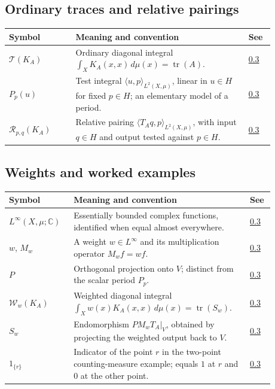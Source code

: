 \subsection*{Ordinary traces and relative pairings}\label{v1a-notation-pairings}

\begin{longtable}{p{0.22\linewidth}p{0.58\linewidth}p{0.08\linewidth}}
\textbf{Symbol} & \textbf{Meaning and convention} & \textbf{See} \\ \hline
$\mathcal T(K_A)$ & Ordinary diagonal integral $\int_X K_A(x,x)\,d\mu(x)=\operatorname{tr}(A)$. & \hyperref[ordinary-finite-trace]{0.3} \\
$P_p(u)$ & Test integral $\langle u,p\rangle_{L^2(X,\mu)}$, linear in $u\in H$ for fixed $p\in H$; an elementary model of a period. & \hyperref[relative-finite-pairing]{0.3} \\
$\mathcal R_{p,q}(K_A)$ & Relative pairing $\langle T_Aq,p\rangle_{L^2(X,\mu)}$, with input $q\in H$ and output tested against $p\in H$. & \hyperref[relative-finite-pairing]{0.3} \\
\end{longtable}

\subsection*{Weights and worked examples}\label{v1a-notation-weights}

\begin{longtable}{p{0.22\linewidth}p{0.58\linewidth}p{0.08\linewidth}}
\textbf{Symbol} & \textbf{Meaning and convention} & \textbf{See} \\ \hline
$L^\infty(X,\mu;\mathbb C)$ & Essentially bounded complex functions, identified when equal almost everywhere. & \hyperref[weighted-finite-trace]{0.3} \\
$w$, $M_w$ & A weight $w\in L^\infty$ and its multiplication operator $M_wf=wf$. & \hyperref[weighted-finite-trace]{0.3} \\
$P$ & Orthogonal projection onto $V$; distinct from the scalar period $P_p$. & \hyperref[weighted-finite-trace]{0.3} \\
$\mathcal W_w(K_A)$ & Weighted diagonal integral $\int_Xw(x)K_A(x,x)\,d\mu(x)=\operatorname{tr}(S_w)$. & \hyperref[weighted-finite-trace]{0.3} \\
$S_w$ & Endomorphism $P M_wT_A|_V$, obtained by projecting the weighted output back to $V$. & \hyperref[finite-weighted-kernel-identity]{0.3} \\
$1_{\{r\}}$ & Indicator of the point $r$ in the two-point counting-measure example; equals $1$ at $r$ and $0$ at the other point. & \hyperref[finite-three-measurements-example]{0.3} \\
\end{longtable}

